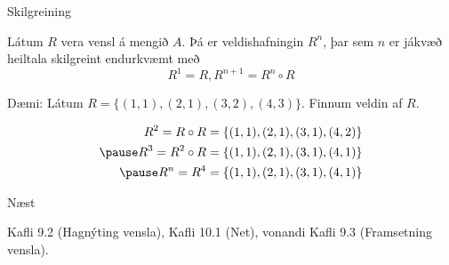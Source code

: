 \documentclass[handout]{beamer}
\begin{document}
\begin{frame}{Skilgreining}
\begin{tcolorbox}[title=Veldishafning]
Látum $R$ vera vensl á mengið $A$. Þá er veldishafningin $R^n$, þar sem $n$ er jákvæð heiltala skilgreint endurkvæmt með
\[
 R^1 = R, R^{n+1} = R^n \circ R
\]
\end{tcolorbox}
Dæmi: Látum $R = \{(1, 1), (2, 1), (3, 2), (4, 3)\}$. Finnum veldin af $R$.

\begin{align*}
R^2 = R \circ R &= \{(1, 1), (2, 1), (3,1), (4,2)\}\\ \pause
R^3 = R^2 \circ R &= \{(1, 1), (2, 1), (3,1), (4,1)\}\\ \pause
R^n = R^4 &= \{(1, 1), (2, 1), (3,1), (4,1)\}
\end{align*}
\end{frame}


\begin{frame}{Næst}

Kafli 9.2 (Hagnýting vensla), Kafli 10.1 (Net), vonandi Kafli 9.3 (Framsetning vensla).

\end{frame}
\end{document}
